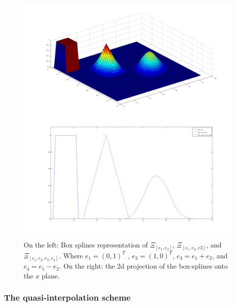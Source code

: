 \documentclass[proc]{edpsmath}
\begin{document}
\begin{figure}[h!]
	\includegraphics[scale=0.15]{figures/boxsplines3d.png}
	\includegraphics[scale=0.15]{figures/boxsplines2d.png}
	\caption{On the left: Box splines representation of $\Xi_[e_1, e_2]$, $\Xi_[e_1, e_2, e3]$, and $\Xi_[e_1, e_2, e_3, e_4]$. Where $e_1 = ( 0, 1 )^T$ , $e_2 = ( 1, 0)^T$, $e_3 = e_1 + e_2$, and $e_4 = e_1 - e_2$. On the right: the 2d projection of the box-splines onto the $x$ plane.}
	\label{fig:boxsplines3d}
\end{figure}

	


\subsubsection{The quasi-interpolation scheme}
\end{document}
